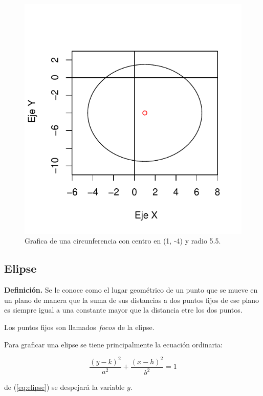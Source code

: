 \documentclass[12pt,a4paper]{report}
\begin{document}
\begin{figure}
\centering
\includegraphics[scale=0.9]{Circunferencia2}
\caption{Grafica de una circunferencia con centro en (1, -4) y radio 5.5.}
\label{fig:Circunferencia2}
\end{figure}

\newpage
\subsection{Elipse}

\textbf{Definición.} Se le conoce como el lugar geométrico de un punto que se mueve en un plano de manera que la suma de sus distancias a dos puntos fijos de ese plano es siempre igual a una constante mayor que la distancia etre los dos puntos.

Los puntos fijos son llamados $focos$ de la elipse. 


Para graficar una elipse  se tiene principalmente la ecuación ordinaria:


\begin{equation}
\frac{(y-k)^2}{a^2}+  \frac{(x-h)^2}{b^2}= 1 \label{eq:elipse}
\end{equation}

 de (\ref{eq:elipse}) se despejará la variable $y$.
 
\end{document}
